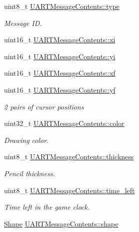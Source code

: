 \begin{DoxyCompactItemize}
\item 
uint8\+\_\+t \mbox{\hyperlink{group__uart__wordgame_ga620cb65b8b21f7759e3d524baca5d4d9}{U\+A\+R\+T\+Message\+Contents\+::type}}
\begin{DoxyCompactList}\small\item\em Message ID. \end{DoxyCompactList}\item 
uint16\+\_\+t \mbox{\hyperlink{group__uart__wordgame_gad44fda3c5128884f864a3304cea15223}{U\+A\+R\+T\+Message\+Contents\+::xi}}
\item 
uint16\+\_\+t \mbox{\hyperlink{group__uart__wordgame_gaa122ebaa3ea886f2d646562abe6b7bae}{U\+A\+R\+T\+Message\+Contents\+::yi}}
\item 
uint16\+\_\+t \mbox{\hyperlink{group__uart__wordgame_gaf730ea29c7bd3292cf775a4bd27ee754}{U\+A\+R\+T\+Message\+Contents\+::xf}}
\item 
uint16\+\_\+t \mbox{\hyperlink{group__uart__wordgame_ga2c627a100a7a97b45a8a96bfd6194e26}{U\+A\+R\+T\+Message\+Contents\+::yf}}
\begin{DoxyCompactList}\small\item\em 2 pairs of cursor positions \end{DoxyCompactList}\item 
uint32\+\_\+t \mbox{\hyperlink{group__uart__wordgame_gaf63ceb10b5565e8d603be982db362f98}{U\+A\+R\+T\+Message\+Contents\+::color}}
\begin{DoxyCompactList}\small\item\em Drawing color. \end{DoxyCompactList}\item 
uint8\+\_\+t \mbox{\hyperlink{group__uart__wordgame_gac30bc759eb1783575a370cf80eef8b75}{U\+A\+R\+T\+Message\+Contents\+::thickness}}
\begin{DoxyCompactList}\small\item\em Pencil thickness. \end{DoxyCompactList}\item 
uint8\+\_\+t \mbox{\hyperlink{group__uart__wordgame_ga93b24ec1227430152c347672090d0723}{U\+A\+R\+T\+Message\+Contents\+::time\+\_\+left}}
\begin{DoxyCompactList}\small\item\em Time left in the game clock. \end{DoxyCompactList}\item 
\mbox{\hyperlink{group__canvas_ga55b506070847a13554f8b879c1bfb37c}{Shape}} \mbox{\hyperlink{group__uart__wordgame_ga7475f18f59857fa2012597615624a3a9}{U\+A\+R\+T\+Message\+Contents\+::shape}}

\end{DoxyCompactItemize}
